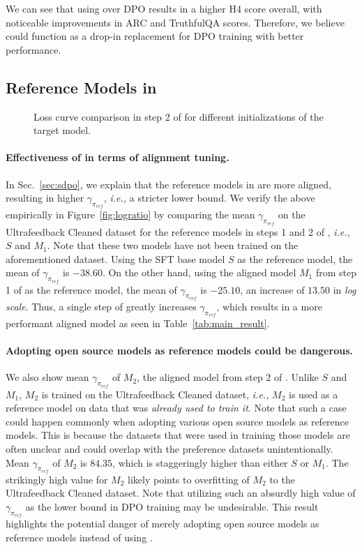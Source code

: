 We can see that using \method over DPO results in a higher H4 score overall, with noticeable improvements in ARC and TruthfulQA scores.
Therefore, we believe \method could function as a drop-in replacement for DPO training with better performance.

\subsection{Reference Models in \method}

\begin{figure}[t!]
    \centering
    \caption{Loss curve comparison in step 2 of \method for different initializations of the target model.}
    \label{fig:init}
\end{figure}

\paragraph{Effectiveness of \method in terms of alignment tuning.}
In Sec.~\ref{sec:sdpo}, we explain that the reference models in \method are more aligned, resulting in higher $\gamma_{\pi_{ref}}$, \textit{i.e.,} a stricter lower bound.
We verify the above empirically in Figure~\ref{fig:logratio} by comparing the mean $\gamma_{\pi_{ref}}$ on the Ultrafeedback Cleaned dataset for the reference models in steps 1 and 2 of \method, \textit{i.e.,} $S$ and $M_1$.
Note that these two models have not been trained on the aforementioned dataset.
Using the SFT base model $S$ as the reference model, the mean of $\gamma_{\pi_{ref}}$ is $-38.60$.
On the other hand, using the aligned model $M_1$ from step 1 of \method as the reference model, the mean of $\gamma_{\pi_{ref}}$ is $-25.10$, an increase of $13.50$ in \textit{log scale}.
Thus, a single step of \method greatly increases $\gamma_{\pi_{ref}}$, which results in a more performant aligned model as seen in Table~\ref{tab:main_result}.

\paragraph{Adopting open source models as reference models could be dangerous.}
We also show mean $\gamma_{\pi_{ref}}$ of $M_2$, the aligned model from step 2 of \method.
Unlike $S$ and $M_1$, $M_2$ is trained on the Ultrafeedback Cleaned dataset, \textit{i.e.,} $M_2$ is used as a reference model on data that was {\it already used to train it}.
Note that such a case could happen commonly when adopting various open source models as reference models.
This is because the datasets that were used in training those models are often unclear and could overlap with the preference datasets unintentionally.
Mean $\gamma_{\pi_{ref}}$ of $M_2$ is $84.35$, which is staggeringly higher than either $S$ or $M_1$. 
The strikingly high value for $M_2$ likely points to overfitting of $M_2$ to the Ultrafeedback Cleaned dataset.
Note that utilizing such an absurdly high value of $\gamma_{\pi_{ref}}$ as the lower bound in DPO training may be undesirable.
This result highlights the potential danger of merely adopting open source models as reference models instead of using \method.


